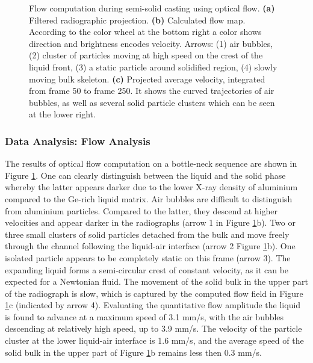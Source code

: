\begin{figure}[ht]
  \centerline{
    \mbox{}
    \mbox{}
    \mbox{}
  }
  \caption{ Flow computation during semi-solid casting using optical flow. \textbf{(a)} Filtered radiographic projection. \textbf{(b)}  Calculated flow map. According to the color wheel at the bottom right a color shows direction and brightness encodes velocity. Arrows: (1) air bubbles, (2) cluster of particles moving at high speed on the crest of the liquid front, (3) a static particle around solidified region, (4) slowly moving bulk skeleton. \textbf{(c)}  Projected average velocity, integrated from frame 50 to frame 250. It shows the curved trajectories of air bubbles, as well as several solid particle clusters which can be seen at the lower right.}
  \label{fig:app_thixo_flow}
\end{figure}



\subsubsection{Data Analysis: Flow Analysis}

The results of optical flow computation on a bottle-neck sequence are shown in Figure \ref{fig:app_thixo_flow}. One can clearly distinguish between the liquid and the solid phase whereby the latter appears darker due to the lower
X-ray density of aluminium compared to the Ge-rich liquid matrix. Air bubbles are difficult to distinguish from aluminium particles. Compared to the latter, they descend at higher velocities and appear darker in the radiographs (arrow 1 in Figure \ref{fig:app_thixo_flow}b).  Two or three small clusters of solid particles detached from the bulk and move freely through the channel following the liquid-air interface (arrow 2 Figure \ref{fig:app_thixo_flow}b).
One isolated particle appears to be completely static on this frame (arrow 3). The expanding liquid forms a semi-circular crest of constant velocity, as it can be expected for a Newtonian fluid. The movement of the solid bulk in the upper part of the radiograph is slow, which is captured by the computed flow field in Figure \ref{fig:app_thixo_flow}c (indicated by arrow 4). Evaluating the quantitative flow amplitude the liquid is found to advance at a maximum speed of 3.1 mm/s, with the air bubbles descending at relatively high speed, up to 3.9 mm/s. The velocity of the particle cluster at the lower liquid-air interface is 1.6 mm/s, and the average speed of the solid bulk in the upper part of Figure \ref{fig:app_thixo_flow}b remains less then 0.3 mm/s. 

